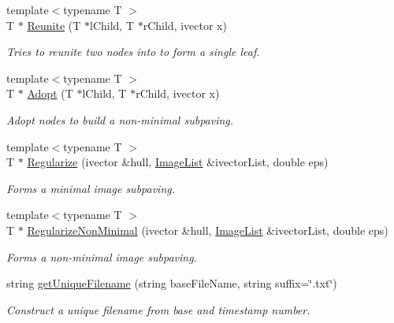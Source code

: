 \begin{DoxyCompactItemize}
{\footnotesize template$<$typename T $>$ }\\\-T $\ast$ \hyperlink{namespacesubpavings_aa20ef6d47135f798ecc95164f0e6fdec}{\-Reunite} (\-T $\ast$l\-Child, \-T $\ast$r\-Child, ivector x)
\begin{DoxyCompactList}\small\item\em \-Tries to reunite two nodes into to form a single leaf. \end{DoxyCompactList}\item 
{\footnotesize template$<$typename T $>$ }\\\-T $\ast$ \hyperlink{namespacesubpavings_a45a1b2decaa4425e57280110a635cf0d}{\-Adopt} (\-T $\ast$l\-Child, \-T $\ast$r\-Child, ivector x)
\begin{DoxyCompactList}\small\item\em \-Adopt nodes to build a non-\/minimal subpaving. \end{DoxyCompactList}\item 
{\footnotesize template$<$typename T $>$ }\\\-T $\ast$ \hyperlink{namespacesubpavings_a331c50e79d716580fed8a900bfee2b1a}{\-Regularize} (ivector \&hull, \hyperlink{namespacesubpavings_acf161e8d79f04bf197a33277dd633f6d}{\-Image\-List} \&ivector\-List, double eps)
\begin{DoxyCompactList}\small\item\em \-Forms a minimal image subpaving. \end{DoxyCompactList}\item 
{\footnotesize template$<$typename T $>$ }\\\-T $\ast$ \hyperlink{namespacesubpavings_ab59f7407c562f2b1b4f051e479c9736f}{\-Regularize\-Non\-Minimal} (ivector \&hull, \hyperlink{namespacesubpavings_acf161e8d79f04bf197a33277dd633f6d}{\-Image\-List} \&ivector\-List, double eps)
\begin{DoxyCompactList}\small\item\em \-Forms a non-\/minimal image subpaving. \end{DoxyCompactList}\item 
string \hyperlink{namespacesubpavings_ae23d4a36711d5b768cacab3fdb72b609}{get\-Unique\-Filename} (string base\-File\-Name, string suffix=\char`\"{}.txt\char`\"{})
\begin{DoxyCompactList}\small\item\em \-Construct a unique filename from base and timestamp number. \end{DoxyCompactList}\item 

\end{DoxyCompactItemize}
